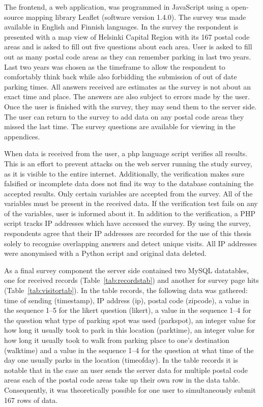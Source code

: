 The frontend, a web application, was programmed in JavaScript using a open-source mapping library Leaflet (software version 1.4.0). The survey was made available in English and Finnish languages. In the survey the respondent is presented with a map view of Helsinki Capital Region with its 167 postal code areas and is asked to fill out five questions about each area. User is asked to fill out as many postal code areas as they can remember parking in last two years. Last two years was chosen as the timeframe to allow the respondent to comfortably think back while also forbidding the submission of out of date parking times. All answers received are estimates as the survey is not about an exact time and place. The answers are also subject to errors made by the user. Once the user is finished with the survey, they may send them to the server side. The user can return to the survey to add data on any postal code areas they missed the last time. The survey questions are available for viewing in the appendices.

When data is received from the user, a \gls{php} language script verifies all results. This is an effort to prevent attacks on the web server running the study survey, as it is visible to the entire internet. Additionally, the verification makes sure falsified or incomplete data does not find its way to the database containing the accepted results. Only certain variables are accepted from the survey. All of the variables must be present in the received data. If the verification test fails on any of the variables, user is informed about it. In addition to the verification, a PHP script tracks IP addresses which have accessed the survey. By using the survey, respondents agree that their IP addresses are recorded for the use of this thesis solely to recognise overlapping answers and detect unique visits. All IP addresses were anonymised with a Python script and original data deleted.

As a final survey component the server side contained two MySQL datatables, one for received records (Table~\ref{tab:recordstab}) and another for survey page hits (Table~\ref{tab:visitortab}). In the table records, the following data was gathered: time of sending (timestamp), IP address (ip), postal code (zipcode), a value in the sequence 1--5 for the likert question (likert), a value in the sequence 1--4 for the question what type of parking spot was used (parkspot), an integer value for how long it usually took to park in this location (parktime), an integer value for how long it usually took to walk from parking place to one's destination (walktime) and a value in the sequence 1--4 for the question at what time of the day one usually parks in the location (timeofday). In the table records it is notable that in the case an user sends the server data for multiple postal code areas each of the postal code areas take up their own row in the data table. Consequently, it was theoretically possible for one user to simultaneously submit 167 rows of data.

